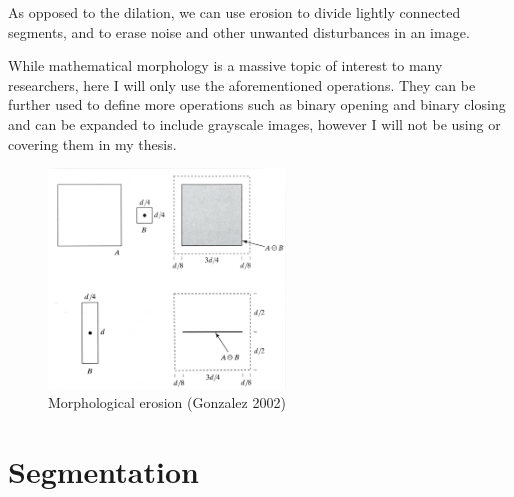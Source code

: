 \documentclass[
  digital,     %
  oneside,     %
  nosansbold,  %
  nocolorbold, %
  lof,         %
  lot,         %
]{fithesis4}
\begin{document}
As opposed to the dilation, we can use erosion to divide lightly connected
segments, and to erase noise and other unwanted disturbances in an image.

While mathematical morphology is a massive topic of interest to many
researchers, here I will only use the aforementioned operations. They can be
further used to define more operations such as binary opening and binary closing
and can be expanded to include grayscale images, however I will not be using or covering
them in my thesis.

\begin{figure}
    \begin{center}
        \includegraphics[width=6.3cm]{resources/morph_erosion.jpg}
    \end{center}
    \caption{Morphological erosion (Gonzalez 2002)} %
    \label{fig:morph_erosion}
\end{figure}

\section{Segmentation}
\end{document}
